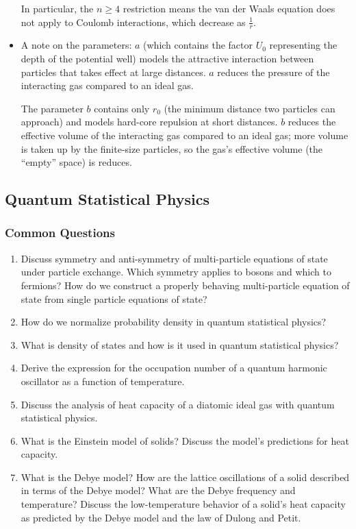 \documentclass[11pt, a4paper]{article}
\begin{document}
\begin{itemize}
	In particular, the $ n \geq 4 $ restriction means the van der Waals equation does not apply to Coulomb interactions, which decrease as $ \frac{1}{r} $.
	
	\item A note on the parameters: $ a $ (which contains the factor $ U_{0} $ representing the depth of the potential well) models the attractive interaction between particles that takes effect at large distances. $ a $ reduces the pressure of the interacting gas compared to an ideal gas.
	
	The parameter $ b $ contains only $ r_{0} $ (the minimum distance two particles can approach) and models hard-core repulsion at short distances. $ b $ reduces the effective volume of the interacting gas compared to an ideal gas; more volume is taken up by the finite-size particles, so the gas's effective volume (the ``empty'' space) is reduces. 
	\fi

\end{itemize}



\subsection{Quantum Statistical Physics}

\subsubsection{Common Questions}
\begin{enumerate}
    \item Discuss symmetry and anti-symmetry of multi-particle equations of state under particle exchange. Which symmetry applies to bosons and which to fermions? How do we construct a properly behaving multi-particle equation of state from single particle equations of state?

    \item How do we normalize probability density in quantum statistical physics?

    \item What is density of states and how is it used in quantum statistical physics?

    \item Derive the expression for the occupation number of a quantum harmonic oscillator as a function of temperature.

    \item Discuss the analysis of heat capacity of a diatomic ideal gas with quantum statistical physics.

    \item What is the Einstein model of solids? Discuss the model's predictions for heat capacity.

    \item What is the Debye model? How are the lattice oscillations of a solid described in terms of the Debye model? What are the Debye frequency and temperature? Discuss the low-temperature behavior of a solid's heat capacity as predicted by the Debye model and the law of Dulong and Petit.

\end{enumerate}
\end{document}
